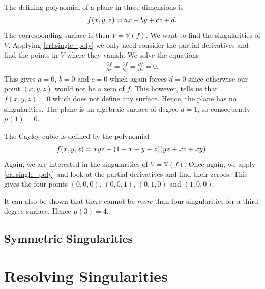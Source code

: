 \documentclass{article}
\newcommand{\V}{\mathbb{V}}
\begin{document}
\begin{example}
    The defining polynomial of a plane in three dimensions is 
    \begin{equation}
        \notag
        f(x, y, z) = ax + by + cz + d.
    \end{equation}
    The corresponding surface is then $V = \V(f)$. We want to find the
    singularities of $V$. Applying \cref{crl:single_poly} we only need consider
    the partial derivatives and find the points in $V$ where they vanish. We
    solve the equations
    \begin{align*}
        \frac{\partial f}{\partial x} = \frac{\partial f}{\partial y} = \frac{\partial f}{\partial z} = 0.
    \end{align*} 
    This gives $a = 0$, $b = 0$ and $c = 0$ which again forces $d = 0$ since
    otherwise our point $(x, y, z)$ would not be a zero of $f$. This however,
    tells us that $f(x, y, z) = 0$ which does not define any surface. Hence,
    the plane has no singularities. The plane is an algebraic surface of degree
    $d = 1$, so consequently $\mu(1) = 0$.
\end{example}

\begin{example}
    The Cayley cubic is defined by the polynomial
    \begin{equation}
        \notag
        f(x, y, z) = xyz + (1 - x - y - z)(yz + xz + xy).
    \end{equation}
    Again, we are interested in the singularities of $V = \V(f)$. Once again,
    we apply \cref{crl:single_poly} and look at the partial derivatives and
    find their zeroes. This gives the four points $(0, 0, 0)$, $(0, 0, 1)$,
    $(0, 1, 0)$ and $(1, 0, 0)$.

    It can also be shown that there cannot be \emph{more} than four
    singularities for a third degree surface. Hence $\mu(3) = 4$.
\end{example}

\subsection{Symmetric Singularities}
\label{sub:symmetric_singularities}


\section{Resolving Singularities}
\label{sec:resolving_singularities}
\end{document}
